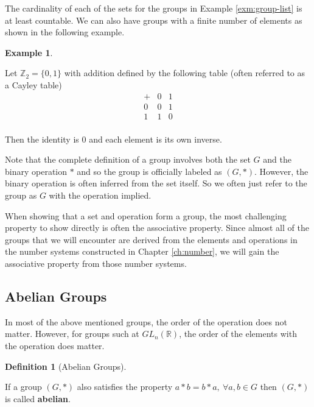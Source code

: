 \documentclass[
]{book}
\theoremstyle{definition}
\newtheorem{definition}{Definition}[chapter]
\theoremstyle{definition}
\newtheorem{example}{Example}[chapter]
\theoremstyle{definition}
\theoremstyle{definition}
\theoremstyle{remark}
\begin{document}
The cardinality of each of the sets for the groups in Example \ref{exm:group-list} is at least countable. We can also have groups with a finite number of elements as shown in the following example.

\begin{example}
\protect\hypertarget{exm:z2}{}\label{exm:z2}

Let \(\mathbb{Z}_2=\{0,1\}\) with addition defined by the following table (often referred to as a Cayley table)
\[\begin{array}{c|cc}
+ & 0 & 1 \\ \hline
0 & 0 & 1 \\
1 & 1 & 0 \\
\end{array}\]

Then the identity is \(0\) and each element is its own inverse.

\end{example}

Note that the complete definition of a group involves both the set \(G\) and the binary operation \(*\) and so the group is officially labeled as \((G,*)\). However, the binary operation is often inferred from the set itself. So we often just refer to the group as \(G\) with the operation implied.

When showing that a set and operation form a group, the most challenging property to show directly is often the associative property. Since almost all of the groups that we will encounter are derived from the elements and operations in the number systems constructed in Chapter \ref{ch:number}, we will gain the associative property from those number systems.

\hypertarget{abelian-groups}{%
\subsection{Abelian Groups}\label{abelian-groups}}

In most of the above mentioned groups, the order of the operation does not matter. However, for groups such at \(GL_n(\mathbb{R})\), the order of the elements with the operation does matter.

\begin{definition}[Abelian Groups]
\protect\hypertarget{def:unlabeled-div-77}{}\label{def:unlabeled-div-77}

If a group \((G,*)\) also satisfies the property \(a*b=b*a, \: \forall a,b\in G\)
then \((G,*)\) is called \textbf{abelian}.

\end{definition}
\end{document}
